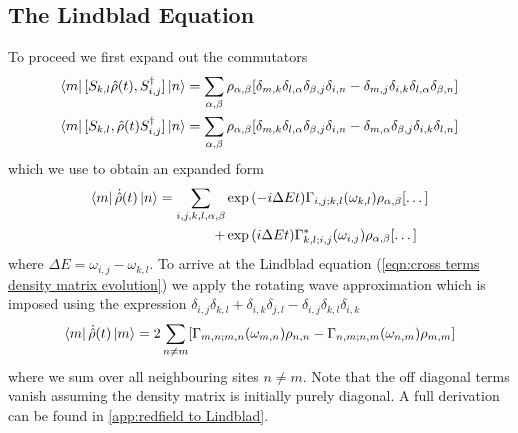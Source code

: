 \subsection{The Lindblad Equation}\label{sec:Lindblad equation}
To proceed we first expand out the commutators
\begin{align}
    \bra{m}[S_{k, l}\hat{\rho}(t),
    S^\dagger_{i, j}] \ket{n}              & =
    \sum_{\alpha, \beta} \rho_{\alpha, \beta} [
        \delta_{m, k}\delta_{l, \alpha}
        \delta_{\beta, j}\delta_{i, n}
        -\delta_{m, j}\delta_{i, k}
    \delta_{l, \alpha}\delta_{\beta, n}]       \\
    \bra{m}[S_{k, l},
    \hat{\rho}(t)S^\dagger_{i, j}] \ket{n} & =
    \sum_{\alpha, \beta} \rho_{\alpha, \beta} [
        \delta_{m, k}\delta_{l, \alpha}
        \delta_{\beta, j}\delta_{i, n}
        -\delta_{m, \alpha}\delta_{\beta, j}
        \delta_{i, k}\delta_{l, n}]
\end{align}
which we use to obtain an expanded
form
\begin{equation}
    \bra{m}\dot{\hat{\rho}}(t) \ket{n} = \begin{aligned}[t]
        \sum_{i,j,k, l, \alpha, \beta} &
        \exp{(-i\Delta{}Et)}
        \Gamma_{i,j;k, l}(\omega_{k,l})
        \rho_{\alpha, \beta} [\dots]                          \\
        +                              & \exp{(i\Delta{}E t)}
        \Gamma^*_{k, l; i,j}(\omega_{i,j})
        \rho_{\alpha, \beta} [\dots]
    \end{aligned}
\end{equation}
where \(\Delta{}E = \omega_{i,j}-\omega_{k,l}\).
To arrive at the
Lindblad equation (\cref{eqn:cross terms density matrix evolution})
we apply the rotating wave approximation
which is imposed
using the expression
\(\delta_{i,j}\delta_{k,l}
+ \delta_{i,k}\delta_{j,l}
- \delta_{i,j}\delta_{k,l}
\delta_{i,k}\)
\begin{equation}
    \bra{m}\dot{\hat{\rho}}(t) \ket{m}  =
    2 \sum_{n\neq m}
    [  \Gamma_{m,n;m, n}(\omega_{m,n})\rho_{n, n}
        - \Gamma_{n,m;n, m}(\omega_{n,m})\rho_{m, m}]
    \label{eqn:lindblad eqn final form}
\end{equation}
where we sum over all neighbouring
sites \(n \neq m\). Note that
the off diagonal
terms vanish assuming the
density matrix is initially
purely diagonal. A full derivation
can be found in
\cref{app:redfield to Lindblad}.



